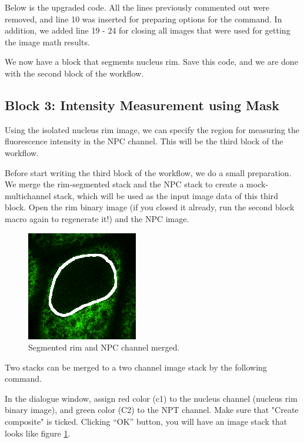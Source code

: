 Below is the upgraded code. All the lines previously commented out were removed, and line 10 was inserted for preparing options for the  command. In addition, we added line 19 - 24 for closing all images that were used for getting the image math results. 



We now have a block that segments nucleus rim. Save this code, and we are done with the second block of the workflow. 

\subsection{Block 3: Intensity Measurement using Mask}

Using the isolated nucleus rim image, we can specify the region for measuring the fluorescence intensity in the NPC channel. This will be the third block of the workflow. 

Before start writing the third block of the workflow, we do a small preparation. We merge the rim-segmented stack and the NPC stack to create a mock-multichannel stack, which will be used as the input image data of this third block. Open the rim binary image (if you closed it already, run the second block macro again to regenerate it!) and the NPC image.  

\begin{figure}[h!]
\begin{center}
\includegraphics[scale=1.0]{fig/NucRimNPTMerged.png}
\caption{Segmented rim and NPC channel merged.}
\label{fig:NucRimMerged}
\end{center}
\end{figure}

Two stacks can be merged to a two channel image stack by the following command.  


In the dialogue window, assign red color (c1) to the nucleus channel (nucleus rim binary image), and  green color (C2) to the NPT channel. Make sure that "Create composite" is ticked. Clicking ``OK'' button, you will have an image stack that looks like figure \ref{fig:NucRimMerged}.

